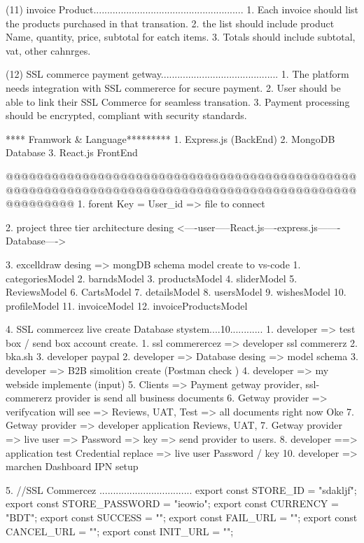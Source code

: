 (11) invoice Product.......................................................
     1. Each invoice should list the products purchased in that transation.
     2. the list should include product Name, quantity, price, subtotal for eatch items.
     3. Totals should include subtotal, vat, other cahnrges.

(12) SSL commerce payment getway...........................................
     1. The platform needs integration with SSL commererce for secure payment.
     2. User should be able to link their SSL Commerce for seamless transation.
     3. Payment processing should be encrypted, compliant with security standards.

     
**** Framwork & Language*********
     1. Express.js (BackEnd)
     2. MongoDB Database
     3. React.js FrontEnd  


@@@@@@@@@@@@@@@@@@@@@@@@@@@@@@@@@@@@@@@@@@@@@@@@@@@@@@@@@@@@@@@@@@@@@@@@@@@@@@@@@@@@@@@@@@@@@@@@@@@@@
1. forent Key = User_id => file to connect

2. project three tier architecture desing
   <----user-----React.js----express.js-------Database---->

3. excelldraw desing => mongDB schema model create to vs-code  
   1. categoriesModel
   2. barndsModel
   3. productsModel
   4. sliderModel
   5. ReviewsModel
   6. CartsModel
   7. detailsModel
   8. usersModel
   9. wishesModel
   10. profileModel
   11. invoiceModel
   12. invoiceProductsModel

4. SSL commercez live create Database stystem....10............
   1. developer =>  test box / send box account create.
      1. ssl commerercez => developer ssl commererz
      2. bka.sh 
      3. developer paypal 
   2. developer => Database desing => model schema
   3. developer => B2B simolition create (Postman check )
   4. developer => my webside  implemente (input)
   5. Clients => Payment getway provider, ssl-commererz provider is send all business documents 
   6. Getway provider => verifycation will see => Reviews, UAT, Test => all documents right now Oke
   7. Getway provider => developer application Reviews, UAT, 
   7. Getway provider => live user => Password => key => send provider to users.
   8. developer ==> application test Credential replace => live user Password / key 
   10. developer => marchen Dashboard IPN setup

5. //SSL Commercez ..................................
export const STORE_ID = "sdakljf";
export const STORE_PASSWORD = "ieowio";
export const CURRENCY = "BDT";
export const SUCCESS = "";
export const FAIL_URL = "";
export const CANCEL_URL = "";
export const INIT_URL = "";


